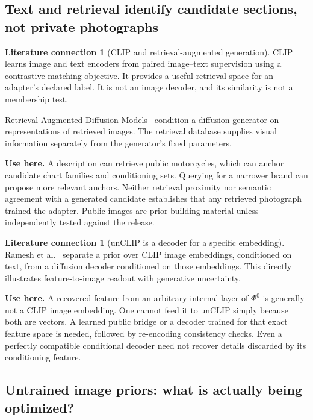 \documentclass[11pt,a4paper]{article}
\theoremstyle{definition}
\theoremstyle{definition}
\newtheorem{literature}[theorem]{Literature connection}
\theoremstyle{remark}\newtheorem{remark}[theorem]{Remark}
\begin{document}
\subsection{Text and retrieval identify candidate sections, not private photographs}

\begin{literature}[CLIP and retrieval-augmented generation]\label{lit:retrieval}
CLIP~\cite{clip} learns image and text encoders from paired image--text supervision using a contrastive matching objective. It provides a useful retrieval space for an adapter's declared label. It is not an image decoder, and its similarity is not a membership test.

Retrieval-Augmented Diffusion Models~\cite{rdm} condition a diffusion generator on representations of retrieved images. The retrieval database supplies visual information separately from the generator's fixed parameters.

\textbf{Use here.} A description can retrieve public motorcycles, which can anchor candidate chart families and conditioning sets. Querying for a narrower brand can propose more relevant anchors. Neither retrieval proximity nor semantic agreement with a generated candidate establishes that any retrieved photograph trained the adapter. Public images are prior-building material unless independently tested against the release.
\end{literature}

\begin{literature}[unCLIP is a decoder for a specific embedding]\label{lit:unclip}
Ramesh et al.~\cite{unclip} separate a prior over CLIP image embeddings, conditioned on text, from a diffusion decoder conditioned on those embeddings. This directly illustrates feature-to-image readout with generative uncertainty.

\textbf{Use here.} A recovered feature from an arbitrary internal layer of $\Phi^0$ is generally not a CLIP image embedding. One cannot feed it to unCLIP simply because both are vectors. A learned public bridge or a decoder trained for that exact feature space is needed, followed by re-encoding consistency checks. Even a perfectly compatible conditional decoder need not recover details discarded by its conditioning feature.
\end{literature}

\subsection{Untrained image priors: what is actually being optimized?}
\end{document}

